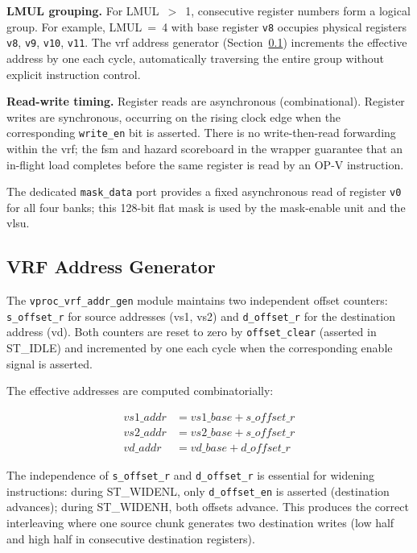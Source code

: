 \textbf{LMUL grouping.} For LMUL~$>$~1, consecutive register numbers form a logical
group. For example, LMUL~=~4 with base register \texttt{v8} occupies physical registers
\texttt{v8}, \texttt{v9}, \texttt{v10}, \texttt{v11}. The \gls{vrf} address generator
(Section~\ref{subsec:addr_gen}) increments the effective address by one each cycle,
automatically traversing the entire group without explicit instruction control.

\textbf{Read-write timing.} Register reads are asynchronous (combinational). Register
writes are synchronous, occurring on the rising clock edge when the corresponding
\texttt{write\_en} bit is asserted. There is no write-then-read forwarding within the
\gls{vrf}; the \gls{fsm} and hazard scoreboard in the wrapper guarantee that an
in-flight load completes before the same register is read by an OP-V instruction.

The dedicated \texttt{mask\_data} port provides a fixed asynchronous read of register
\texttt{v0} for all four banks; this 128-bit flat mask is used by the mask-enable unit
and the \gls{vlsu}.

\subsection{VRF Address Generator}
\label{subsec:addr_gen}

The \texttt{vproc\_vrf\_addr\_gen} module maintains two independent offset counters:
\texttt{s\_offset\_r} for source addresses (vs1, vs2) and \texttt{d\_offset\_r} for
the destination address (vd). Both counters are reset to zero by \texttt{offset\_clear}
(asserted in ST\_IDLE) and incremented by one each cycle when the corresponding enable
signal is asserted.

The effective addresses are computed combinatorially:

\begin{equation}
\begin{aligned}
\mathit{vs1\_addr} &= \mathit{vs1\_base} + \mathit{s\_offset\_r} \\
\mathit{vs2\_addr} &= \mathit{vs2\_base} + \mathit{s\_offset\_r} \\
\mathit{vd\_addr}  &= \mathit{vd\_base}  + \mathit{d\_offset\_r}
\end{aligned}
\label{eq:vrf_addr}
\end{equation}

The independence of \texttt{s\_offset\_r} and \texttt{d\_offset\_r} is essential for
widening instructions: during ST\_WIDENL, only \texttt{d\_offset\_en} is asserted
(destination advances); during ST\_WIDENH, both offsets advance. This produces the
correct interleaving where one source chunk generates two destination writes (low
half and high half in consecutive destination registers).

